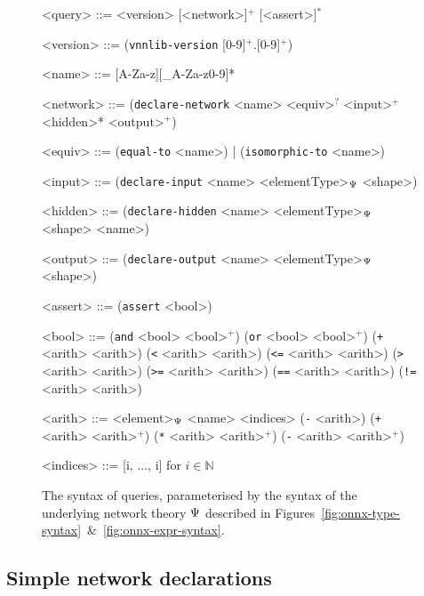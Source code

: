 \begin{figure}[p]
	\setlength{\grammarindent}{6.5em}
	
	\begin{grammar}
	<query> ::= <version> [<network>]$^+$ [<assert>]$^*$
	
	<version> ::= (\texttt{vnnlib-version} [0-9]$^+$.[0-9]$^+$)
	
	<name> ::= [A-Za-z][\_A-Za-z0-9]*
		
	<network> ::= (\texttt{declare-network} <name> <equiv>$^?$ <input>$^+$ <hidden>* <output>$^+$)
	
	<equiv> ::= (\texttt{equal-to} <name>) | (\texttt{isomorphic-to} <name>)
	
	<input> ::= (\texttt{declare-input} <name> <elementType>$_\Psi$ <shape>)
	
	<hidden> ::= (\texttt{declare-hidden} <name> <elementType>$_\Psi$ <shape> <name>)
	
	<output> ::= (\texttt{declare-output} <name> <elementType>$_\Psi$ <shape>)
	
	<assert> ::= (\texttt{assert} <bool>)
	
	<bool> ::= (\texttt{and} <bool> <bool>$^+$)
	\alt (\texttt{or} <bool> <bool>$^+$)
	\alt (\texttt{+} <arith> <arith>)
	\alt (\texttt{\textless} <arith> <arith>)
	\alt (\texttt{\textless=} <arith> <arith>)
	\alt (\texttt{\textgreater} <arith> <arith>)
	\alt (\texttt{\textgreater=} <arith> <arith>)
	\alt (\texttt{==} <arith> <arith>)
	\alt (\texttt{!=} <arith> <arith>)
	
	<arith> ::= <element>$_\Psi$
	\alt <name> <indices>
	\alt (\texttt{-} <arith>)
	\alt (\texttt{+} <arith> <arith>$^+$)
	\alt (\texttt{*} <arith> <arith>$^+$)
	\alt (\texttt{-} <arith> <arith>$^+$)
	
	<indices> ::= [i, ..., i] for $i \in \mathbb{N}$
	\end{grammar}
	\vspace{-1em}
    \caption{The syntax of \vnnlib{} queries, parameterised by the syntax of the underlying network theory $\Psi$ described in Figures~\ref{fig:onnx-type-syntax}~\&~\ref{fig:onnx-expr-syntax}. }
    \label{fig:vnnlib-syntax}
\end{figure}

\subsection{Simple network declarations}
\label{sec:network-declarations}

